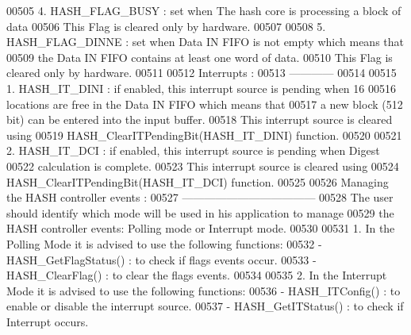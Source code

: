 \begin{DoxyCode}
00505 \textcolor{comment}{     4. HASH\_FLAG\_BUSY :  set when The hash core is processing a block of data}
00506 \textcolor{comment}{                          This Flag is cleared only by hardware. }
00507 \textcolor{comment}{                           }
00508 \textcolor{comment}{     5. HASH\_FLAG\_DINNE : set when Data IN FIFO is not empty which means that }
00509 \textcolor{comment}{                          the Data IN FIFO contains at least one word of data.}
00510 \textcolor{comment}{                          This Flag is cleared only by hardware.}
00511 \textcolor{comment}{     }
00512 \textcolor{comment}{  Interrupts :}
00513 \textcolor{comment}{  ------------}
00514 \textcolor{comment}{    }
00515 \textcolor{comment}{   1. HASH\_IT\_DINI  : if enabled, this interrupt source is pending when 16 }
00516 \textcolor{comment}{                      locations are free in the Data IN FIFO  which means that }
00517 \textcolor{comment}{                      a new block (512 bit) can be entered into the input buffer.}
00518 \textcolor{comment}{                      This interrupt source is cleared using }
00519 \textcolor{comment}{                      HASH\_ClearITPendingBit(HASH\_IT\_DINI) function.}
00520 \textcolor{comment}{   }
00521 \textcolor{comment}{   2. HASH\_IT\_DCI   : if enabled, this interrupt source is pending when Digest }
00522 \textcolor{comment}{                      calculation is complete.}
00523 \textcolor{comment}{                      This interrupt source is cleared using }
00524 \textcolor{comment}{                      HASH\_ClearITPendingBit(HASH\_IT\_DCI) function.}
00525 \textcolor{comment}{}
00526 \textcolor{comment}{  Managing the HASH controller events :}
00527 \textcolor{comment}{  ------------------------------------ }
00528 \textcolor{comment}{  The user should identify which mode will be used in his application to manage }
00529 \textcolor{comment}{  the HASH controller events: Polling mode or Interrupt mode.}
00530 \textcolor{comment}{  }
00531 \textcolor{comment}{  1.  In the Polling Mode it is advised to use the following functions:}
00532 \textcolor{comment}{      - HASH\_GetFlagStatus() : to check if flags events occur. }
00533 \textcolor{comment}{      - HASH\_ClearFlag()     : to clear the flags events.}
00534 \textcolor{comment}{    }
00535 \textcolor{comment}{  2.  In the Interrupt Mode it is advised to use the following functions:}
00536 \textcolor{comment}{      - HASH\_ITConfig()       : to enable or disable the interrupt source.}
00537 \textcolor{comment}{      - HASH\_GetITStatus()    : to check if Interrupt occurs.}

\end{DoxyCode}
